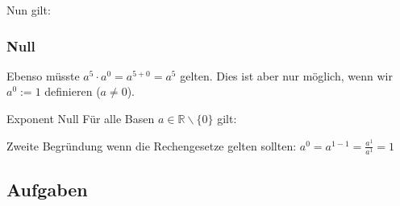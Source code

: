 Nun gilt:




\subsubsection{Null}

Ebenso müsste $a^5 \cdot a^0 = a^{5+0} = a^5$ gelten. Dies ist aber
nur möglich, wenn wir $a^0 := 1$ definieren ($a\ne 0$).

\begin{definition}{Exponent Null}{} Für alle Basen $a \in \mathbb{R}\backslash\{0\}$ gilt:
\begin{center}
\end{center}
\end{definition}

Zweite Begründung wenn die Rechengesetze gelten sollten: $a^0 = a^{1-1} = \frac{a^1}{a^1} = 1$


 



\newpage

\subsection{Aufgaben}



